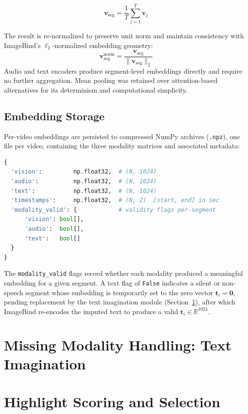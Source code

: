 \documentclass[12pt,a4paper,oneside,english]{book}
\begin{document}
\begin{equation}
\mathbf{v}_{\text{seg}} = \frac{1}{T} \sum_{j=1}^{T} \mathbf{v}_j
\end{equation}

The result is re-normalized to preserve unit norm and maintain consistency with ImageBind's $\ell_2$-normalized embedding geometry:
\begin{equation}
\mathbf{v}_{\text{seg}}^{\text{norm}} = 
\frac{\mathbf{v}_{\text{seg}}}{\|\mathbf{v}_{\text{seg}}\|_2}
\end{equation}
Audio and text encoders produce segment-level embeddings directly and require no further aggregation. Mean pooling was retained over attention-based alternatives for its determinism and computational simplicity.

\subsection{Embedding Storage}
\label{subsec:embedding_storage}
Per-video embeddings are persisted to compressed NumPy archives (\texttt{.npz}), one file per video, containing the three modality matrices and associated metadata:
\begin{lstlisting}[language=Python, caption={Embedding storage schema}]
{
  'vision':         np.float32,  # (N, 1024)
  'audio':          np.float32,  # (N, 1024)
  'text':           np.float32,  # (N, 1024)
  'timestamps':     np.float32,  # (N, 2)  [start, end] in sec
  'modality_valid': {            # validity flags per-segment
      'vision': bool[],
      'audio':  bool[],
      'text':   bool[]
  }
}
\end{lstlisting}
The \texttt{modality\_valid} flags record whether each modality produced a meaningful embedding for a given segment. A text flag of \texttt{False} indicates a silent or non-speech segment whose embedding is temporarily set to the zero vector $\mathbf{t}_i = \mathbf{0}$, pending replacement by the text imagination module (Section~\ref{sec:text_imagination}),
after which ImageBind re-encodes the imputed text to produce a valid $\mathbf{t}_i \in \mathbb{R}^{1024}$.

\section{Missing Modality Handling: Text Imagination}%
\label{sec:text_imagination}
\section{Highlight Scoring and Selection}%
\end{document}
